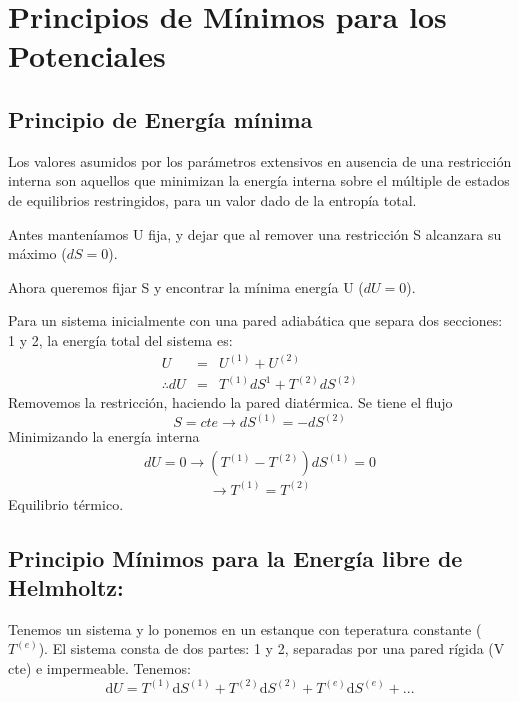 \documentclass[10pt,twocolumn]{IEEEtran2e}
\newcommand{\ud}{\mathrm{d}}
\begin{document}
\section{Principios de M\'inimos para los Potenciales}
\subsection*{Principio de Energ\'ia m\'inima}
Los valores asumidos por los par\'ametros extensivos en ausencia de una restricci\'on interna son aquellos que minimizan la energ\'ia interna sobre el m\'ultiple de estados de equilibrios restringidos, para un valor dado de la entrop\'ia total.

Antes manten\'iamos U fija, y dejar que al remover una restricci\'on S alcanzara su m\'aximo ($dS=0$).

Ahora queremos fijar S y encontrar la m\'inima energ\'ia U ($dU=0$).

Para un sistema inicialmente con una pared adiab\'atica que separa dos secciones: 1 y 2, la energ\'ia total del sistema es:
\begin{eqnarray}
 U&=&U^{(1)}+U^{(2)}\\
 \therefore dU &=& T^{(1)}dS^{1}+T^{(2)}dS^{(2)}
\end{eqnarray}
 Removemos la restricci\'on, haciendo la pared diat\'ermica. Se tiene el flujo
\begin{equation}
 S=cte \longrightarrow dS^{(1)}=-dS^{(2)}
\end{equation}
Minimizando la energ\'ia interna
\begin{eqnarray}
 dU = 0 \longrightarrow \left(T^{(1)}-T^{(2)}\right)dS^{(1)}=0
\end{eqnarray}
\begin{equation}
 \longrightarrow T^{(1)}=T^{(2)}
\end{equation}
Equilibrio t\'ermico.

\subsection*{Principio M\'inimos para la Energ\'ia libre de Helmholtz:}

Tenemos un sistema y lo ponemos en un estanque con teperatura constante ($T^{(e)}$). El sistema consta de dos partes: 1 y 2, separadas por una pared r\'igida (V cte) e impermeable. Tenemos:
\begin{equation}
 \ud U = T^{(1)} \ud S^{(1)}+T^{(2)} \ud S^{(2)} + T^{(e)} \ud S^{(e)} + ...
\end{equation}
\end{document}
